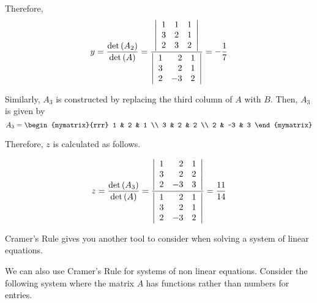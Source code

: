 \begin{solution}
Therefore, 
\begin{equation*}
y=\vspace{0.05in}\frac{\det \left(A_{2}\right)}{\det \left(A\right)} = \vspace{0.05in}\frac{\left|
\begin{array}{rrr}
1 & 1 & 1 \\
3 & 2 & 1 \\
2 & 3 & 2
\end{array}
\right| }{\left|
\begin{array}{rrr}
1 & 2 & 1 \\
3 & 2 & 1 \\
2 & -3 & 2
\end{array}
\right| }=-\vspace{0.05in}\frac{1}{7}
\end{equation*}

Similarly, $A_3$ is constructed by replacing the third column of $A$ with $B$. Then, $A_3$ is given by
\begin{equation*}
A_3
=
\begin{mymatrix}{rrr}
1 & 2 & 1 \\
3 & 2 & 2 \\
2 & -3 & 3
\end{mymatrix}
\end{equation*}

Therefore, $z$ is calculated as follows. 

\begin{equation*}
z=
\vspace{0.05in}\frac{\det \left(A_{3}\right)}{\det \left(A\right)}
=
\frac{\left|
\begin{array}{rrr}
1 & 2 & 1 \\
3 & 2 & 2 \\
2 & -3 & 3
\end{array}
\right| }{\left|
\begin{array}{rrr}
1 & 2 & 1 \\
3 & 2 & 1 \\
2 & -3 & 2
\end{array}
\right| }=\frac{11}{14}
\end{equation*}
\end{solution}

Cramer's Rule gives you another tool to consider when solving a system of linear equations.

We can also use Cramer's Rule for systems of non linear equations. Consider the following system 
where the matrix $A$ has functions rather than numbers for entries. 

